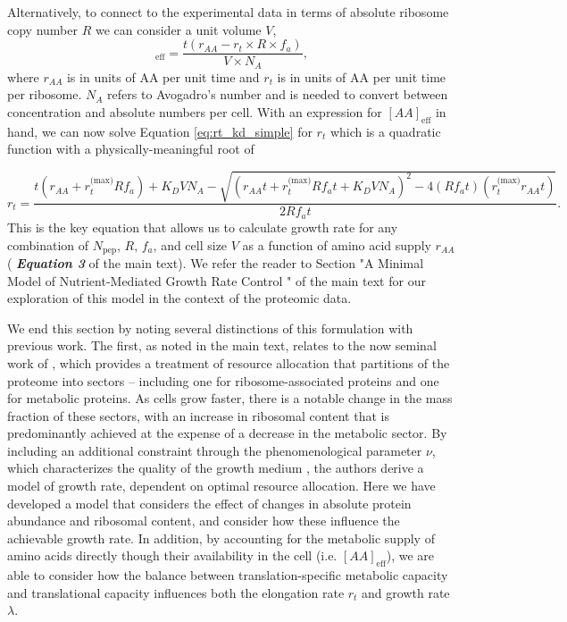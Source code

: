 Alternatively, to connect to the experimental data in terms of absolute ribosome
copy number $R$ we can consider a unit volume $V$,
\begin{equation}
   [AA]_\text{eff} = \frac{t(r_{AA} - r_t \times R \times f_a)}{V \times N_A},
   \label{eq:aa_final}
\end{equation}
where $r_{AA}$ is in units of AA per unit time and $r_t$ is in units of AA per
unit time per ribosome. $N_A$ refers to Avogadro's number and is needed to
convert between  concentration and absolute numbers per cell. With an expression
for $[AA]_\text{eff}$ in hand, we can now solve Equation \ref{eq:rt_kd_simple} for $r_t$
which is a quadratic function with a physically-meaningful root of

\begin{equation}
r_t = \frac{t(r_{AA} + r_t^\text{(max)}Rf_a) + K_D V N_A - \sqrt{(r_{AA}t + r_t^\text{(max)}Rf_at + K_D V N_A)^2 - 4(Rf_at)(r_t^\text{(max)}r_{AA} t)}}{2Rf_at}.
\label{eq:rt_root}
\end{equation}
This is the key equation that allows us to calculate growth rate for any
combination of $N_\text{pep}$, $R$, $f_a$, and cell size $V$ as a function of
amino acid supply $r_{AA}$ ( \textbf{\textit{Equation 3}}  of the main text). We
refer the reader to Section "A Minimal Model of Nutrient-Mediated Growth Rate
Control " of the main text for our exploration of this model in the context of
the proteomic data.

We end this section by noting several distinctions of this formulation with
previous work. The first, as noted in the main text, relates to the now seminal
work of \cite{scott2010}, which provides a treatment of resource allocation that
partitions of the proteome into sectors -- including one for ribosome-associated
proteins and one for metabolic proteins. As cells grow faster, there is a
notable change in the mass fraction of these sectors, with an increase in
ribosomal content that is predominantly achieved at the expense of a decrease in
the metabolic sector. By including an additional constraint through the
phenomenological parameter $\nu$,  which characterizes the quality of the growth
medium \cite{scott2010, klumpp2013, klumpp2014}, the authors derive a model of
growth rate, dependent on optimal resource allocation. Here we have developed a
model that considers the effect of changes in absolute protein abundance and
ribosomal content, and consider how these influence the achievable growth rate.
In addition, by accounting for the metabolic supply of amino acids directly
though their availability in the cell (i.e. $[AA]_\text{eff}$), we are able to
consider how the balance between translation-specific metabolic capacity and
translational capacity influences both the elongation rate $r_t$ and growth
rate $\lambda$.

